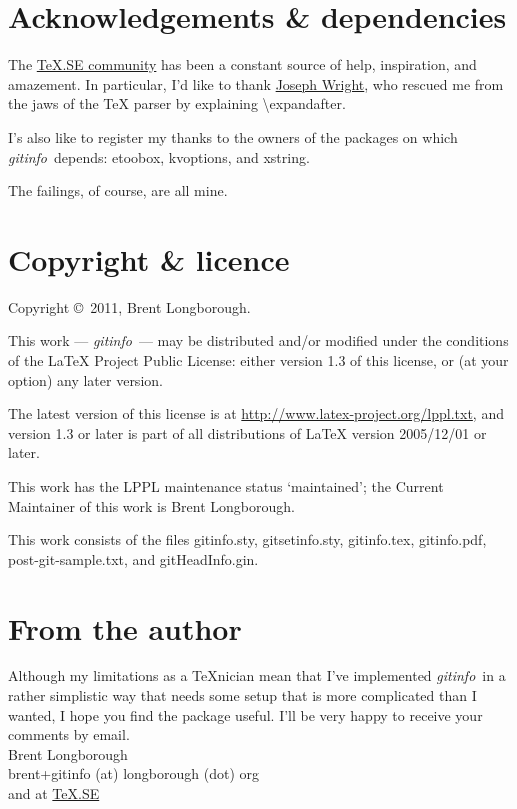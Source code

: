 \documentclass[a4paper,12pt,twoside,openany]{memoir}
\newcommand{\sfit}[1]{\textit{#1}}
\newcommand{\tpname}{\sfit{gitinfo}}
\newcommand{\ginname}{gitHeadInfo.gin}
\begin{document}
\section{Acknowledgements \& dependencies}

The \href{http://tex.stackexchange.com}{\TeX.SE community}
has been a constant source of help, inspiration, and amazement.
In particular, I'd like to thank
\href{http://tex.stackexchange.com/users/73/joseph-wright}{Joseph Wright},
who rescued me from the jaws of the TeX parser by explaining
\textbackslash expandafter.

I's also like to register my thanks to the owners of the packages on which
\tpname\ depends: etoobox, kvoptions, and xstring.

The failings, of course, are all mine.
\section{Copyright \& licence}
Copyright \copyright\ 2011, Brent Longborough.

This work --- \tpname\ --- may be distributed and/or modified under the
conditions of the LaTeX Project Public License: either version 1.3
of this license, or (at your option) any later version.

The latest version of this license is at
\url{http://www.latex-project.org/lppl.txt},
and version 1.3 or later is part of all distributions of \LaTeX
version 2005/12/01 or later.

This work has the LPPL maintenance status `maintained';
the Current Maintainer of this work is Brent Longborough.

This work consists of the files 
gitinfo.sty, gitsetinfo.sty, gitinfo.tex, gitinfo.pdf,
post-git-sample.txt, and \ginname.
\section{From the author}
Although my limitations as a \TeX nician
mean that I've implemented \tpname\ in a rather simplistic way
that needs some setup that is more complicated than I wanted,
I hope you find the package useful.
I'll be very happy to receive your comments by email.\\[\baselineskip]
Brent Longborough\\[\baselineskip]
\textsf{brent+gitinfo (at) longborough (dot) org}\\
and at \href{http://tex.stackexchange.com/users/344/brent-longborough}{\TeX.SE}
\end{document}
